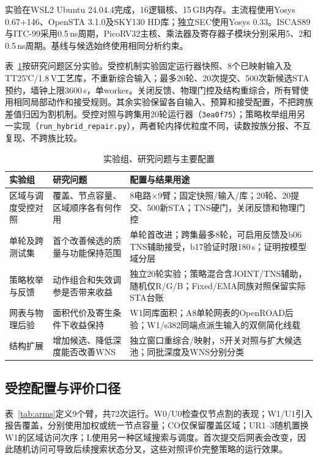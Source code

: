 \documentclass[twocolumn,10pt,fontset=windows]{ctexart}
\begin{document}
实验在WSL2 Ubuntu 24.04.4完成，16逻辑核、15\,GB内存。主流程使用Yosys 0.67+146、OpenSTA 3.1.0及SKY130 HD库；独立SEC使用Yosys 0.33。ISCAS89\cite{iscas89}与ITC-99\cite{itc99}采用0.5\,ns周期，PicoRV32主核、乘法器及寄存器子模块分别采用5、2和0.5\,ns周期。基线与候选始终使用相同分析约束。

表~\ref{tab:families}按研究问题区分实验。受控机制实验固定运行器快照、8个已映射输入及TT25℃/1.8\,V工艺库，不重新综合输入；最多20轮、20次提交、500次新候选STA预约，墙钟上限3600\,s，单worker。关闭反馈、物理门控及结构重综合，所有臂使用相同局部动作和接受规则。其余实验保留各自输入、预算和接受配置，不把跨族差值归因为割机制。受控对照与跨集用20轮运行器（\texttt{3ea0f75}）；策略枚举组用另一实现（\texttt{run\_hybrid\_repair.py}），两者轮内择优粒度不同，读数按族分报、不互复现、不跨族比较。

\begin{table}[!t]
\centering\caption{实验组、研究问题与主要配置}\label{tab:families}
\footnotesize\setlength{\tabcolsep}{4pt}
\begin{tabular}{p{2.1cm}p{4.2cm}p{9.1cm}}
\toprule
实验组 & 研究问题 & 配置与结果用途\\
\midrule
区域与调度受控对照 & 覆盖、节点容量、区域顺序各有何作用 & 8电路$\times$9臂；固定快照/输入/库；20轮、20提交、500新STA；TNS硬门，关闭反馈和物理门控\\
单轮及跨测试集 & 首个改善候选的质量与功能保持范围 & 单轮首改进；跨集最多8轮，可启用反馈及b06 TNS辅助接受，b17验证时限180\,s；证明按模型域分层\\
策略枚举与反馈 & 动作组合和失效调参是否带来收益 & 独立20轮实验；策略混合含JOINT/TNS辅助，随机仅R/G/B；Fixed/EMA同族对照保留实际STA台账\\
网表与物理后验 & 面积代价及寄生条件下收益保持 & W1同库面积；A8单轮网表的OpenROAD后验；W1/s382同端点派生输入的双侧简化线载\\
结构扩展 & 增加候选、降低深度能否改善WNS & 独立窗口重综合/映射，S开关对照与扩大候选池；同批深度及WNS分别分类\\
\bottomrule
\end{tabular}
\end{table}

\subsection{受控配置与评价口径}\label{sec:controlled}

表~\ref{tab:arms}定义9个臂，共72次运行。W0/U0检查仅节点割的表现；W1/U1引入报告覆盖，分别使用加权或统一节点容量；CO仅保留覆盖区域；UR1--3随机置换W1的区域访问次序；L使用另一种区域搜索与调度。首次提交后网表会改变，因此随机访问可导致后续搜索状态分叉，这些对照评价完整策略的运行效果。
\end{document}
